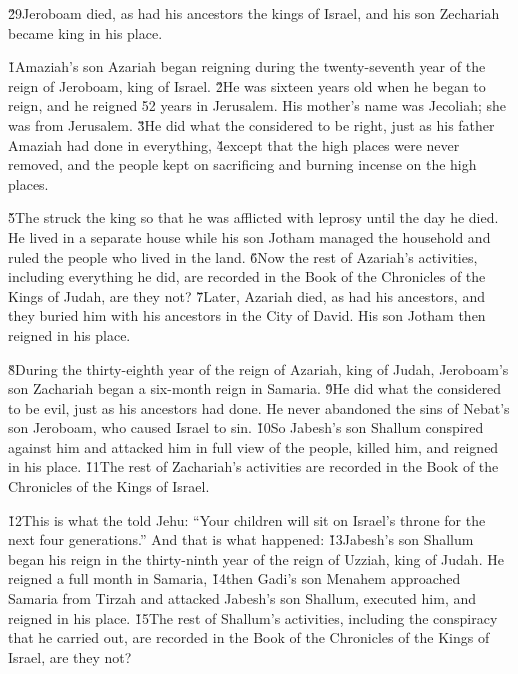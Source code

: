 \v{29}Jeroboam died, as had his ancestors the kings of Israel, and his son Zechariah became king in his place.

\v{1}Amaziah's son Azariah began reigning during the twenty-seventh year of the reign of Jeroboam, king of Israel. \v{2}He was sixteen years old when he began to reign, and he reigned 52 years in Jerusalem. His mother's name was Jecoliah; she was from Jerusalem. \v{3}He did what the  considered to be right, just as his father Amaziah had done in everything, \v{4}except that the high places were never removed, and the people kept on sacrificing and burning incense on the high places.

\v{5}The  struck the king so that he was afflicted with leprosy until the day he died. He lived in a separate house while his son Jotham managed the household and ruled the people who lived in the land. \v{6}Now the rest of Azariah's activities, including everything he did, are recorded in the Book of the Chronicles of the Kings of Judah, are they not? \v{7}Later, Azariah died, as had his ancestors, and they buried him with his ancestors in the City of David. His son Jotham then reigned in his place.

\v{8}During the thirty-eighth year of the reign of Azariah, king of Judah, Jeroboam's son Zachariah began a six-month reign in Samaria. \v{9}He did what the  considered to be evil, just as his ancestors had done. He never abandoned the sins of Nebat's son Jeroboam, who caused Israel to sin. \v{10}So Jabesh's son Shallum conspired against him and attacked him in full view of the people, killed him, and reigned in his place. \v{11}The rest of Zachariah's activities are recorded in the Book of the Chronicles of the Kings of Israel.

\v{12}This is what the  told Jehu: ``Your children will sit on Israel's throne for the next four generations.'' And that is what happened: \v{13}Jabesh's son Shallum began his reign in the thirty-ninth year of the reign of Uzziah, king of Judah. He reigned a full month in Samaria, \v{14}then Gadi's son Menahem approached Samaria from Tirzah and attacked Jabesh's son Shallum, executed him, and reigned in his place. \v{15}The rest of Shallum's activities, including the conspiracy that he carried out, are recorded in the Book of the Chronicles of the Kings of Israel, are they not?

